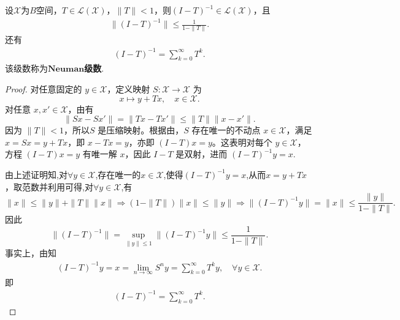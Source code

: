 \documentclass[../../main.tex]{subfiles}%
\begin{document}
\begin{lemma}\label{lemma:泛函分析--纽曼级数}
设$\mathscr{X}$为$B$空间，$T\in\mathscr{L}(\mathscr{X})$，$\|T\|<1$，则$(I-T)^{-1}\in\mathscr{L}(\mathscr{X})$，且
\begin{align}
\|(I-T)^{-1}\|\leqslant\frac{1}{1-\|T\|}.\label{eq:neuman_est}
\end{align}
还有
\begin{align*}
(I-T)^{-1}=\sum\limits_{k=0}^{\infty}T^k.
\end{align*}
该级数称为$\mathbf{Neuman}$\textbf{级数}.
\end{lemma}
\begin{proof}
对任意固定的 \(y\in\mathscr{X}\)，定义映射 \(S:\mathscr{X}\to\mathscr{X}\) 为
\[
x \mapsto y + Tx,\quad x\in\mathscr{X}.
\]
对任意 \(x,x'\in\mathscr{X}\)，由有
\[
\|Sx - Sx'\| = \|Tx - Tx'\| \leqslant \|T\|\|x-x'\|.
\]
因为 \(\|T\|<1\)，所以\(S\) 是压缩映射。根据由，\(S\) 存在唯一的不动点 \(x\in\mathscr{X}\)，满足 \(x = Sx = y + Tx\)，即 \(x - Tx = y\)，亦即 \((I-T)x = y\)。这表明对每个 \(y\in\mathscr{X}\)，方程 \((I-T)x = y\) 有唯一解 \(x\)，因此 \(I-T\) 是双射，进而 \((I-T)^{-1}y = x\).

由上述证明知,对$\forall y\in \mathscr{X}$,存在唯一的$x\in \mathscr{X}$,使得$(I-T)^{-1}y=x$,从而\(x = y + Tx\)，取范数并利用可得,对$\forall y\in \mathscr{X}$,有
\[
\|x\| \leqslant \|y\| + \|T\|\|x\|\Longrightarrow (1-\|T\|)\|x\| \leqslant \|y\|\Longrightarrow \|(I-T)^{-1}y\|=\|x\| \leqslant \frac{\|y\|}{1-\|T\|}.
\]
因此
\[
\|(I-T)^{-1}\| = \sup_{\|y\|\leqslant 1}\|(I-T)^{-1}y\| \leqslant \frac{1}{1-\|T\|}.
\]
事实上，由知
\begin{align*}
(I-T)^{-1}y=x=\lim\limits_{n\to\infty}S^n y=\sum\limits_{k=0}^{\infty}T^k y,\quad \forall y\in \mathscr{X}.
\end{align*}
即
\begin{align*}
(I-T)^{-1}=\sum\limits_{k=0}^{\infty}T^k.
\end{align*}
\end{proof}
\end{document}

